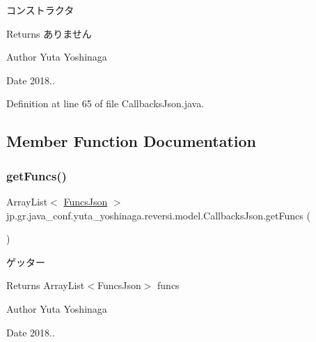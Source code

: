 コンストラクタ 

\begin{DoxyReturn}{Returns}
ありません 
\end{DoxyReturn}
\begin{DoxyAuthor}{Author}
Yuta Yoshinaga 
\end{DoxyAuthor}
\begin{DoxyDate}{Date}
2018.. 
\end{DoxyDate}


Definition at line 65 of file Callbacks\+Json.\+java.



\subsection{Member Function Documentation}
\mbox{\label{classjp_1_1gr_1_1java__conf_1_1yuta__yoshinaga_1_1reversi_1_1model_1_1_callbacks_json_af9a62a3dbe6416793c01d7a0f69da2b1}} 
\subsubsection{\texorpdfstring{get\+Funcs()}{getFuncs()}}
{\footnotesize\ttfamily Array\+List$<$ \mbox{\hyperlink{classjp_1_1gr_1_1java__conf_1_1yuta__yoshinaga_1_1reversi_1_1model_1_1_funcs_json}{Funcs\+Json}} $>$ jp.\+gr.\+java\+\_\+conf.\+yuta\+\_\+yoshinaga.\+reversi.\+model.\+Callbacks\+Json.\+get\+Funcs (\begin{DoxyParamCaption}{ }\end{DoxyParamCaption})}



ゲッター 

\begin{DoxyReturn}{Returns}
Array\+List$<$\+Funcs\+Json$>$ funcs 
\end{DoxyReturn}
\begin{DoxyAuthor}{Author}
Yuta Yoshinaga 
\end{DoxyAuthor}
\begin{DoxyDate}{Date}
2018.. 
\end{DoxyDate}


